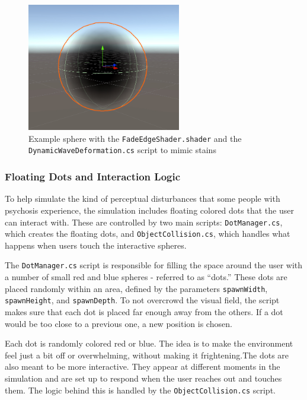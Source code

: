 \begin{figure}[h!] 
    \centering 
    \includegraphics[width=0.6\textwidth]{../../Figures/fadeedgeshader.jpg} 
    \caption{Example sphere with the \texttt{FadeEdgeShader.shader} and the \texttt{DynamicWaveDeformation.cs} script to mimic stains} 
    \label{fig:fadeedgeshader} 
\end{figure}

\subsubsection{Floating Dots and Interaction Logic}

To help simulate the kind of perceptual disturbances that some people with psychosis experience, the simulation includes floating colored dots that the user can interact with. These are controlled by two main scripts: \texttt{DotManager.cs}, which creates the floating dots, and \texttt{ObjectCollision.cs}, which handles what happens when users touch the interactive spheres.

\vspace{1em}

The \texttt{DotManager.cs} script is responsible for filling the space around the user with a number of small red and blue spheres - referred to as “dots.” These dots are placed randomly within an area, defined by the parameters \texttt{spawnWidth}, \texttt{spawnHeight}, and \texttt{spawnDepth}. To not overcrowd the visual field, the script makes sure that each dot is placed far enough away from the others. If a dot would be too close to a previous one, a new position is chosen.

\vspace{1em}

Each dot is randomly colored red or blue. The idea is to make the environment feel just a bit off or overwhelming, without making it frightening.The dots are also meant to be more interactive. They appear at different moments in the simulation and are set up to respond when the user reaches out and touches them. The logic behind this is handled by the \texttt{ObjectCollision.cs} script.

